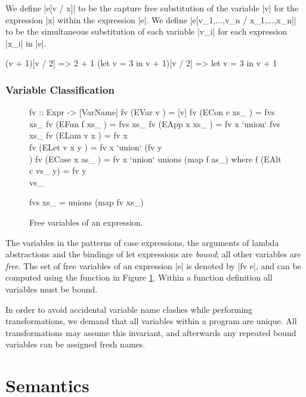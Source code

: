 We define |e[v / x]| to be the capture free substitution of the variable |v| for the expression |x| within the expression |e|. We define |e[v_1,...,v_n / x_1,...,x_n]| to be the simultaneous substitution of each variable |v_i| for each expression |x_i| in |e|.

\begin{example}
\begin{code}
(v + 1)[v / 2]               => 2 + 1
(let v = 3 in v + 1)[v / 2]  => let v = 3 in v + 1
\end{code}
\end{example}

\subsubsection{Variable Classification}

\begin{figure}
\begin{code}
fv :: Expr -> [VarName]
fv (EVar v       ) = [v]
fv (ECon c xs_   ) = fvs xs_
fv (EFun f xs_   ) = fvs xs_
fv (EApp x xs_   ) = fv x `union` fvs xs_
fv (ELam v x     ) = fv x \\ [v]
fv (ELet v x y   ) = fv x `union` (fv y \\ [v])
fv (ECase x as_  ) = fv x `union` unions (map f as_)
    where f (EAlt c vs_ y) = fv y \\ vs_

fvs xs_ = unions (map fv xs_)
\end{code}
\caption{Free variables of an expression.}
\label{figB:free_variables}
\end{figure}

The variables in the patterns of case expressions, the arguments of lambda abstractions and the bindings of let expressions are \textit{bound}; all other variables are \textit{free}. The set of free variables of an expression |e| is denoted by |fv e|, and can be computed using the function in Figure \ref{figB:free_variables}. Within a function definition all variables must be bound.

In order to avoid accidental variable name clashes while performing transformations, we demand that all variables within a program are unique. All transformations may assume this invariant, and afterwards any repeated bound variables can be assigned fresh names.

\section{Semantics}
\label{secB:semantics}

